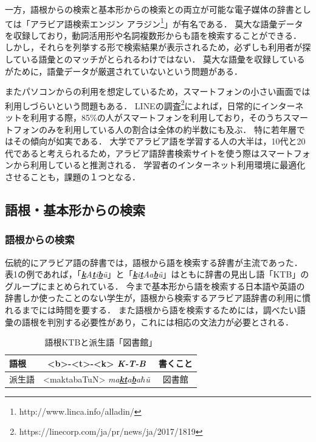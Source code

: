 \documentclass[technicalreport]{ieicej}
\begin{document}
一方，語根からの検索と基本形からの検索との両立が可能な電子媒体の辞書としては「アラビア語検索エンジン アラジン\footnote{http://www.linca.info/alladin/}」が有名である．
莫大な語彙データを収録しており，動詞活用形や名詞複数形からも語を検索することができる．
しかし，それらを列挙する形で検索結果が表示されるため，必ずしも利用者が探している語彙とのマッチがとられるわけではない．
莫大な語彙を収録しているがために，語彙データが厳選されていないという問題がある．

またパソコンからの利用を想定しているため，スマートフォンの小さい画面では利用しづらいという問題もある．
LINEの調査\footnote{https://linecorp.com/ja/pr/news/ja/2017/1819}によれば，日常的にインターネットを利用する際，85\%の人がスマートフォンを利用しており，そのうちスマートフォンのみを利用している人の割合は全体の約半数にも及ぶ．
特に若年層ではその傾向が如実である．
大学でアラビア語を学習する人の大半は，10代と20代であると考えられるため，アラビア語辞書検索サイトを使う際はスマートフォンから利用していると推測される．
学習者のインターネット利用環境に最適化させることも，課題の１つとなる．

\subsection{語根・基本形からの検索}
\subsubsection{語根からの検索}
伝統的にアラビア語の辞書では，語根から語を検索する辞書が主流であった．
表1の例であれば，「\textit{\underline{\textbf{k}}A\underline{\textbf{t}}i\underline{\textbf{b}}\~u}」と「\textit{\underline{\textbf{k}}i\underline{\textbf{t}}Aa\underline{\textbf{b}}\~u}」はともに辞書の見出し語「KTB」のグループにまとめられている．
今まで基本形から語を検索する日本語や英語の辞書しか使ったことのない学生が，語根から検索するアラビア語辞書の利用に慣れるまでには時間を要する．
また語根から語を検索するためには，調べたい語彙の語根を判別する必要性があり，これには相応の文法力が必要とされる．

\begin{table}[ht]
\begin{center}
\begin{tabular}{l|cc}
   語根 & <b>-<t>-<k> \textit{\textbf{K-T-B}} & 書くこと\\
  \hline
 派生語 & <maktabaTuN> \textit{ma\underline{\textbf{k}}\underline{\textbf{t}}a\underline{\textbf{b}}a$\hbar$\~u} & 図書館\\
\hline
\end{tabular}
\caption{語根KTBと派生語「図書館」}
\label{table:alignment}
\end{center}
\end{table}
\end{document}
